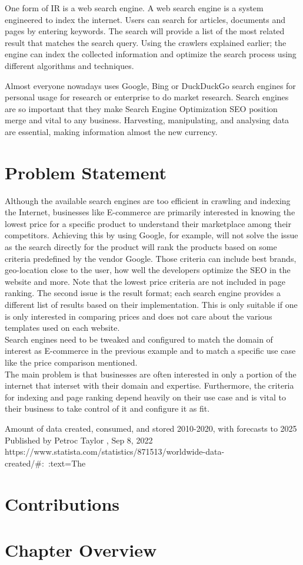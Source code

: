 One form of IR is a web search engine. A web search engine is a system engineered to index the internet. Users can search for articles, documents and pages by entering keywords. The search will provide a list of the most related result that matches the search query. Using the crawlers explained earlier; the engine can index the collected information and optimize the search process using different algorithms and techniques. 

Almost everyone nowadays uses Google, Bing or DuckDuckGo search engines for personal usage for research or enterprise to do market research. Search engines are so important that they make Search Engine Optimization SEO position merge and vital to any business. Harvesting, manipulating, and analysing data are essential, making information almost the new currency. 

\section{Problem Statement}

Although the available search engines are too efficient in crawling and indexing the Internet, businesses like E-commerce are primarily interested in knowing the lowest price for a specific product to understand their marketplace among their competitors. Achieving this by using Google, for example, will not solve the issue as the search directly for the product will rank the products based on some criteria predefined by the vendor Google. Those criteria can include best brands, geo-location close to the user, how well the developers optimize the SEO in the website and more. Note that the lowest price criteria are not included in page ranking. The second issue is the result format; each search engine provides a different list of results based on their implementation. This is only suitable if one is only interested in comparing prices and does not care about the various templates used on each website.\\

Search engines need to be tweaked and configured to match the domain of interest as E-commerce in the previous example and to match a specific use case like the price comparison mentioned.\\

The main problem is that businesses are often interested in only a portion of the internet that interset with their domain and expertise. Furthermore, the criteria for indexing and page ranking depend heavily on their use case and is vital to their business to take control of it and configure it as fit. 




Amount of data created, consumed, and stored 2010-2020, with forecasts to 2025
Published by 
Petroc Taylor
, Sep 8, 2022
https://www.statista.com/statistics/871513/worldwide-data-created/#:~:text=The%
\section{Contributions}
\section{Chapter Overview}
